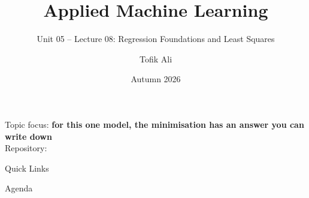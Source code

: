 \documentclass[aspectratio=169]{beamer}
\title[Applied Machine Learning]{Applied Machine Learning}
\subtitle{Unit 05 -- Lecture 08: Regression Foundations and Least Squares}
\author{Tofik Ali}
\institute{School of Computer Science, UPES Dehradun}
\date{Autumn 2026}
\begin{document}
\UPESCoverFrame
\setcounter{framenumber}{0}

\begin{frame}[shrink=5]
  \titlepage
  \begin{center}
    \footnotesize Topic focus: \textbf{for this one model, the minimisation
    has an answer you can write down}\\[0.2em]
    \footnotesize Repository: \texttt{\AMLRepoURL}
  \end{center}
  \slidesources{\AMLUnitVSources}
\end{frame}

\begin{frame}{Quick Links}
  \centering
  \hyperlink{sec:intro}{}\hspace{0.4em}
  \hyperlink{sec:models}{}\hspace{0.4em}
  \hyperlink{sec:steps}{}\hspace{0.4em}
  \hyperlink{sec:slr}{}\hspace{0.4em}
  \hyperlink{sec:derive}{}\\[0.6em]
  \hyperlink{sec:hand}{}\hspace{0.4em}
  \hyperlink{sec:props}{}\hspace{0.4em}
  \hyperlink{sec:matrix}{}\hspace{0.4em}
  \hyperlink{sec:gd}{}\hspace{0.4em}
  \hyperlink{sec:caution}{}\hspace{0.4em}
  \hyperlink{sec:summary}{}
\end{frame}

\begin{frame}{Agenda}
  \tableofcontents
\end{frame}
\end{document}
